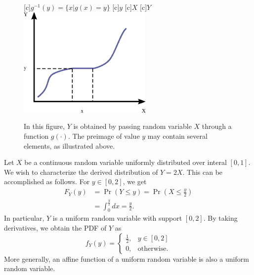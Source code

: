 \begin{figure}[ht]
\begin{center}
\begin{psfrags}
[c]{$g^{-1} (y) = \{ x | g(x) = y \}$}
[c]{$y$}
[c]{$X$}
[c]{$Y$}
\includegraphics[width=6.5cm]{Figures/9Chapter/MonotoneIncreasing}
\end{psfrags}
\caption{In this figure, $Y$ is obtained by passing random variable $X$ through a function $g(\cdot)$.
The preimage of value $y$ may contain several elements, as illustrated above.}
\end{center}
\end{figure}

\begin{example}
Let $X$ be a continuous random variable uniformly distributed over interal $[0, 1]$.
We wish to characterize the derived distribution of $Y = 2X$.
This can be accomplished as follows.
For $y \in [0, 2]$, we get
\begin{equation*}
\begin{split}
F_Y(y) &= \Pr (Y \leq y) = \Pr \left( X \leq \frac{y}{2} \right) \\
&= \int_0^{\frac{y}{2}} dx = \frac{y}{2} .
\end{split}
\end{equation*}
In particular, $Y$ is a uniform random variable with support $[0, 2]$.
By taking derivatives, we obtain the PDF of $Y$ as
\begin{equation*}
f_Y(y) = \begin{cases} \frac{1}{2}, & y \in [0, 2] \\
0, & \text{otherwise}. \end{cases}
\end{equation*}
More generally, an affine function of a uniform random variable is also a uniform random variable.
\end{example}

